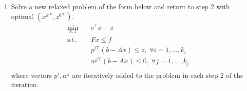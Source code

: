 \documentclass[11pt]{exam}
\begin{document}
\begin{questions}
\begin{parts}
\begin{enumerate}
\begin{enumerate}
        \end{enumerate} 
        \item Solve a new relaxed problem of the form below and return to step 2 with optimal $(x^{k*}, z^{k*})$.
        \begin{align*}
          \min_{x,z} \quad& c^\top x + z\\
          \text{s.t.}\quad& Fx \leq f\\
          & p^{i\top}(b - Ax) \leq z,\; \forall i = 1, \dots, k_i \\
          & w^{j\top}(b - Ax) \leq 0, \; \forall j = 1, \dots, k_j\\
        \end{align*}
        where vectors $p^{i}, w^{j}$ are iteratively added to the problem in each step 2 of the iteration.
      \end{enumerate}

    \end{parts}

\end{questions}
\end{document}
